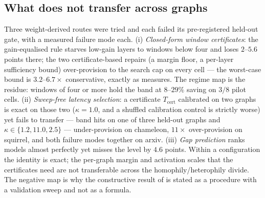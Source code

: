 \subsection{What does not transfer across graphs}
\label{sec:transfer}

Three weight-derived routes were tried and each failed its pre-registered held-out gate, with a
measured failure mode each. (i) \emph{Closed-form window certificates}: the gain-equalised rule
starves low-gain layers to windows below four and loses $2$--$5.6$ points there; the two
certificate-based repairs (a margin floor, a per-layer sufficiency bound) over-provision to the
search cap on every cell --- the worst-case bound is $3.2$--$6.7\times$ conservative, exactly as
 measures. The regime map is the residue: windows of four or more hold the band
at $8$--$29\%$ saving on $3/8$ pilot cells. (ii) \emph{Sweep-free latency selection}: a certificate
$T_{\mathrm{cert}}$ calibrated on two graphs is exact on those two ($\kappa = 1.0$, and a shuffled
calibration control is strictly worse) yet fails to transfer --- band hits on one of three held-out
graphs and $\kappa \in \{1.2, 11.0, 2.5\}$ --- under-provision on chameleon, $11\times$
over-provision on squirrel, and both failure modes together on arxiv. (iii) \emph{Gap prediction}
ranks models almost perfectly yet misses
the level by $4.6$ points. Within a configuration the identity is exact; the per-graph margin and
activation scales that the certificates need are not transferable across the
homophily/heterophily divide. The negative map is why the constructive result of
 is stated as a procedure with a validation sweep and not as a formula.
